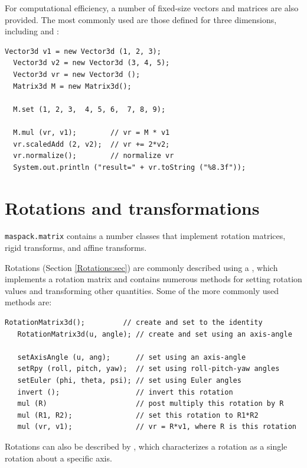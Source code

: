 For computational efficiency, a number of fixed-size vectors and
matrices are also provided. The most commonly used are those defined
for three dimensions, including 
and :
%
\begin{lstlisting}[]
  Vector3d v1 = new Vector3d (1, 2, 3);
  Vector3d v2 = new Vector3d (3, 4, 5);
  Vector3d vr = new Vector3d ();
  Matrix3d M = new Matrix3d();

  M.set (1, 2, 3,  4, 5, 6,  7, 8, 9);

  M.mul (vr, v1);        // vr = M * v1
  vr.scaledAdd (2, v2);  // vr += 2*v2;
  vr.normalize();        // normalize vr
  System.out.println ("result=" + vr.toString ("%8.3f"));
\end{lstlisting}
%

\section{Rotations and transformations}
\label{RigidTransform3d:sec}

{\tt maspack.matrix} contains a number classes that implement rotation
matrices, rigid transforms, and affine transforms. 

Rotations (Section \ref{Rotations:sec}) are commonly described using a
, which implements a
rotation matrix and contains numerous methods for setting rotation
values and transforming other quantities. Some of the more commonly
used methods are:
%
\begin{lstlisting}[]
   RotationMatrix3d();         // create and set to the identity
   RotationMatrix3d(u, angle); // create and set using an axis-angle

   setAxisAngle (u, ang);      // set using an axis-angle
   setRpy (roll, pitch, yaw);  // set using roll-pitch-yaw angles
   setEuler (phi, theta, psi); // set using Euler angles
   invert ();                  // invert this rotation
   mul (R)                     // post multiply this rotation by R
   mul (R1, R2);               // set this rotation to R1*R2
   mul (vr, v1);               // vr = R*v1, where R is this rotation
\end{lstlisting}
%
Rotations can also be described by
, which characterizes a rotation
as a single rotation about a specific axis.

